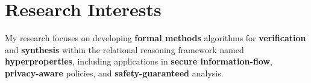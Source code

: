 

\section{Research Interests}

My research focuses on developing {\bf formal methods} algorithms for 
{\bf verification} and {\bf synthesis} within
the relational reasoning framework named {\bf hyperproperties}, 
including applications in
{\bf secure information-flow}, 
{\bf privacy-aware} policies, 
and {\bf safety-guaranteed} analysis.\\

